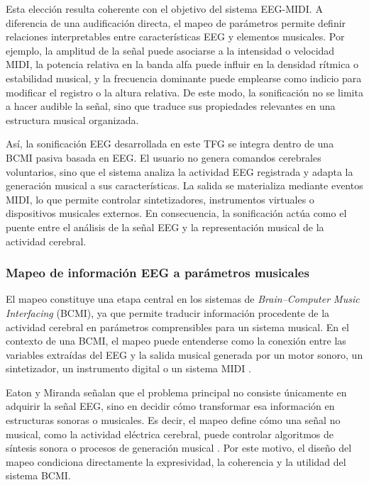 \documentclass[../main.tex]{subfiles}
\begin{document}
Esta elección resulta coherente con el objetivo del sistema EEG-MIDI. A diferencia de una audificación directa, el mapeo de parámetros permite definir relaciones interpretables entre características EEG y elementos musicales. Por ejemplo, la amplitud de la señal puede asociarse a la intensidad o velocidad MIDI, la potencia relativa en la banda alfa puede influir en la densidad rítmica o estabilidad musical, y la frecuencia dominante puede emplearse como indicio para modificar el registro o la altura relativa. De este modo, la sonificación no se limita a hacer audible la señal, sino que traduce sus propiedades relevantes en una estructura musical organizada.

Así, la sonificación EEG desarrollada en este TFG se integra dentro de una BCMI pasiva basada en EEG. El usuario no genera comandos cerebrales voluntarios, sino que el sistema analiza la actividad EEG registrada y adapta la generación musical a sus características. La salida se materializa mediante eventos MIDI, lo que permite controlar sintetizadores, instrumentos virtuales o dispositivos musicales externos. En consecuencia, la sonificación actúa como el puente entre el análisis de la señal EEG y la representación musical de la actividad cerebral.


\subsubsection{Mapeo de información EEG a parámetros musicales}

El mapeo constituye una etapa central en los sistemas de \textit{Brain--Computer Music Interfacing} (BCMI), ya que permite traducir información procedente de la actividad cerebral en parámetros comprensibles para un sistema musical. En el contexto de una BCMI, el mapeo puede entenderse como la conexión entre las variables extraídas del EEG y la salida musical generada por un motor sonoro, un sintetizador, un instrumento digital o un sistema MIDI \cite{EatonMiranda2014Mapping}.

Eaton y Miranda señalan que el problema principal no consiste únicamente en adquirir la señal EEG, sino en decidir cómo transformar esa información en estructuras sonoras o musicales. Es decir, el mapeo define cómo una señal no musical, como la actividad eléctrica cerebral, puede controlar algoritmos de síntesis sonora o procesos de generación musical \cite{EatonMiranda2014Mapping}. Por este motivo, el diseño del mapeo condiciona directamente la expresividad, la coherencia y la utilidad del sistema BCMI.
\end{document}
